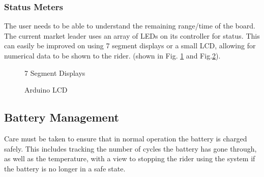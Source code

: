 \documentclass[journal,10pt]{IEEEtran}
\begin{document}
    	\subsubsection{Status Meters}
    		The user needs to be able to understand the remaining range/time of the board. The current market leader uses an array of LEDs on its controller for status. This can easily be improved on using 7 segment displays or a small LCD, allowing for numerical data to be shown to the rider. (shown in Fig. \ref{fig:7 seg} and Fig.\ref{fig:LCD}).
    		
    	\begin{figure}[H]
            \centering
            \caption{7 Segment Displays}
            \label{fig:7 seg}
        \end{figure}
    	\begin{figure}[H]
            \centering
            \caption{Arduino LCD}
            \label{fig:LCD}
        \end{figure}
    \subsection{Battery Management}
    	Care must be taken to ensure that in normal operation the battery is charged safely.
    	This includes tracking the number of cycles the battery has gone through, as well as the temperature, with a view to stopping the rider using the system if the battery is no longer in a safe state.
    	
\end{document}
